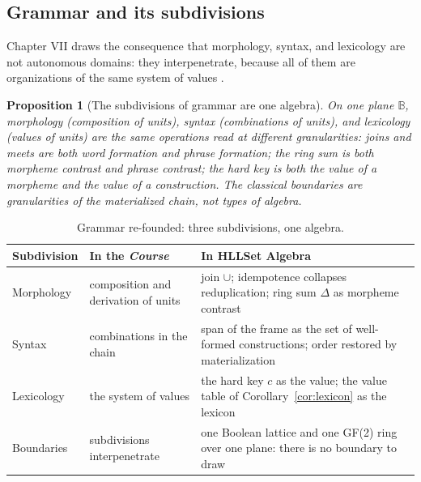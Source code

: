 \documentclass[11pt,a4paper]{article}
\newtheorem{proposition}[principle]{Proposition}
\theoremstyle{remark}
\newcommand{\Plane}{\ensuremath{\mathbb{B}}}            %
\newcommand{\xor}{\ensuremath{\Delta}}                   %
\begin{document}
\subsection{Grammar and its subdivisions}
\label{sec:grammar}

Chapter VII draws the consequence that morphology, syntax, and lexicology are
not autonomous domains: they interpenetrate, because all of them are
organizations of the same system of values \cite[Part II, ch.~VII]{harris1983}.

\begin{proposition}[The subdivisions of grammar are one algebra]
\label{prop:grammar}
On one plane $\Plane$, morphology (composition of units), syntax
(combinations of units), and lexicology (values of units) are the same
operations read at different granularities: joins and meets are both word
formation and phrase formation; the ring sum is both morpheme contrast and
phrase contrast; the hard key is both the value of a morpheme and the value
of a construction. The classical boundaries are granularities of the
materialized chain, not types of algebra.
\end{proposition}

\begin{table}[htbp]
\centering
\renewcommand{\arraystretch}{1.15}
\begin{tabular}{@{}>{\raggedright\arraybackslash}p{3.2cm}
                    >{\raggedright\arraybackslash}p{4.4cm}
                    >{\raggedright\arraybackslash}p{7.4cm}@{}}
\toprule
Subdivision & In the \textit{Course} & In HLLSet Algebra \\
\midrule
Morphology & composition and derivation of units & join $\cup$; idempotence
collapses reduplication; ring sum $\xor$ as morpheme contrast \\
Syntax & combinations in the chain & span of the frame as the set of
well-formed constructions; order restored by materialization \\
Lexicology & the system of values & the hard key $c$ as the value; the value
table of Corollary~\ref{cor:lexicon} as the lexicon \\
Boundaries & subdivisions interpenetrate & one Boolean lattice and one GF(2)
ring over one plane: there is no boundary to draw \\
\bottomrule
\end{tabular}
\caption{Grammar re-founded: three subdivisions, one algebra.}
\label{tab:grammar}
\end{table}
\end{document}
